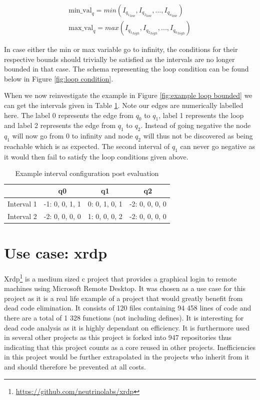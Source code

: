 \documentclass[12pt]{thesis}
\begin{document}
\begin{gather*}
	\text{min\_val}_q = min(I_{{q_1}_{low}}, I_{{q_2}_{low}}, ..., I_{{q_n}_{low}})\\
	\text{max\_val}_q = max(I_{{q_1}_{high}}, I_{{q_2}_{high}}, ..., I_{{q_n}_{high}})
\end{gather*}

In case either the min or max variable go to infinity, the conditions for their respective bounds should trivially be satisfied as the intervals are no longer bounded in that case. The schema representing the loop condition can be found below in Figure \ref{fig:loop condition}.

When we now reinvestigate the example in Figure \ref{fig:example loop bounded} we can get the intervals given in Table \ref{table:example loop bounded intervals}. Note our edges are numerically labelled here. The label 0 represents the edge from $q_0$ to $q_1$, label 1 represents the loop and label 2 represents the edge from $q_1$ to $q_2$. Instead of going negative the node $q_1$ will now go from 0 to infinity and node $q_2$ will thus not be discovered as being reachable which is as expected. The second interval of $q_1$ can never go negative as it would then fail to satisfy the loop conditions given above.

\begin{table}[t]
	\centering
	\begin{tabular}{ |c|c|c|c|  }
		\hline
		& q0 				& q1 			& q2 \\
		\hline
		Interval 1 	& -1: 0, 0, 1, 1	& 0: 0, 1, 0, 1 & -2: 0, 0, 0, 0 \\
		\hline
		Interval 2 	& -2: 0, 0, 0, 0	& 1: 0, 0, 0, 2 & -2: 0, 0, 0, 0 \\
		\hline
	\end{tabular}
	\caption{Example interval configuration post evaluation}
	\label{table:example loop bounded intervals}
\end{table}

\chapter{Use case: xrdp}
Xrdp\footnote{\url{https://github.com/neutrinolabs/xrdp}} is a medium sized c project that provides a graphical login to remote machines using Microsoft Remote Desktop. It was chosen as a use case for this project as it is a real life example of a project that would greatly benefit from dead code elimination. It consists of 120 files containing 94 458 lines of code and there are a total of 1 328 functions (not including defines). It is interesting for dead code analysis as it is highly dependant on efficiency. It is furthermore used in several other projects as this project is forked into 947 repositories thus indicating that this project counts as a core reused in other projects. Inefficiencies in this project would be further extrapolated in the projects who inherit from it and should therefore be prevented at all costs.
\end{document}
